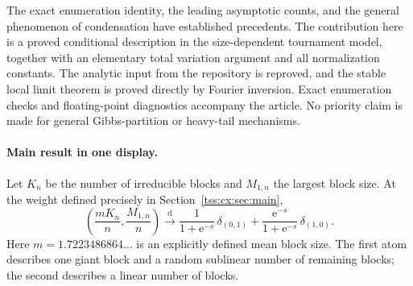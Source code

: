 \documentclass[11pt]{article}
\theoremstyle{remark}\newtheorem{remark}[theorem]{Remark}
\theoremstyle{definition}\newtheorem{definition}[theorem]{Definition}
\newcommand{\e}{\mathrm e}
\newcommand{\dto}{\xrightarrow{\mathrm d}}
\begin{document}
The exact enumeration identity, the leading asymptotic counts, and the
general phenomenon of condensation have established precedents. The
contribution here is a proved conditional description in the
size-dependent tournament model, together with an elementary total
variation argument and all normalization constants. The analytic input
from the repository is reproved, and the stable local limit theorem is
proved directly by Fourier inversion. Exact enumeration checks and
floating-point diagnostics accompany the article. No priority claim is
made for general Gibbs-partition or heavy-tail mechanisms.

\paragraph{Main result in one display.}
Let $K_n$ be the number of irreducible blocks and $M_{1,n}$ the largest
block size. At the weight defined precisely in Section~\ref{tss:cx:sec:main},
\[
 \left(\frac{mK_n}{n},\frac{M_{1,n}}n\right)
 \dto
 \frac{1}{1+\e^{-s}}\,\delta_{(0,1)}
 +\frac{\e^{-s}}{1+\e^{-s}}\,\delta_{(1,0)}.
\]
Here $m=1.7223486864\ldots$ is an explicitly defined mean block size.
The first atom describes one giant block and a random sublinear number
of remaining blocks; the second describes a linear number of blocks.
\end{document}

